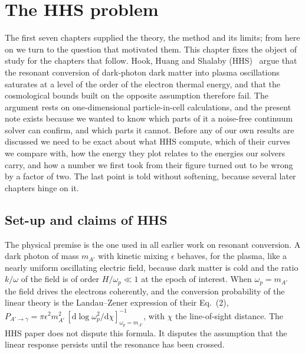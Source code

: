 \chapter{The HHS problem}\label{ch:hhs}

The first seven chapters supplied the theory, the method and its limits; from here on we turn to the question that motivated them. This chapter fixes the object of study for the chapters that follow. Hook, Huang and Shalaby (HHS)~\cite{HHS2026} argue that the resonant conversion of dark-photon dark matter into plasma oscillations saturates at a level of the order of the electron thermal energy, and that the cosmological bounds built on the opposite assumption therefore fail. The argument rests on one-dimensional particle-in-cell calculations, and the present note exists because we wanted to know which parts of it a noise-free continuum solver can confirm, and which parts it cannot. Before any of our own results are discussed we need to be exact about what HHS compute, which of their curves we compare with, how the energy they plot relates to the energies our solvers carry, and how a number we first took from their figure turned out to be wrong by a factor of two. The last point is told without softening, because several later chapters hinge on it.

\section{Set-up and claims of HHS}

The physical premise is the one used in all earlier work on resonant conversion. A dark photon of mass $m_{A'}$ with kinetic mixing $\epsilon$ behaves, for the plasma, like a nearly uniform oscillating electric field, because dark matter is cold and the ratio $k/\omega$ of the field is of order $H/\omega_p\ll1$ at the epoch of interest. When $\omega_p=m_{A'}$ the field drives the electrons coherently, and the conversion probability of the linear theory is the Landau--Zener expression of their Eq.~(2), $P_{A'\to\gamma}=\pi\epsilon^2 m_{A'}^2\,[\mathrm d\log\omega_p^2/\mathrm d\chi]^{-1}_{\omega_p=m_{A'}}$, with $\chi$ the line-of-sight distance. The HHS paper does not dispute this formula. It disputes the assumption that the linear response persists until the resonance has been crossed.


